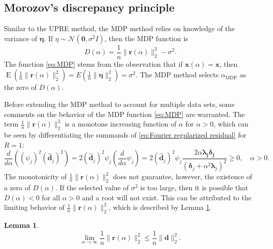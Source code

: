 \documentclass[12pt]{article}
\newcommand{\dVec}{\mathbf{d}}	%
\newcommand{\rVec}{\mathbf{r}}	%
\newcommand{\xVec}{\mathbf{x}}	%
\newcommand{\dft}[1]{\widehat{#1}}	%
\newcommand{\regparam}{\alpha}  %
\newcommand{\xReg}{\xVec(\regparam)}	%
\newcommand{\mfilt}{\psi}
\newcommand{\noise}{\eta}	%
\newcommand{\noiseSD}{\sigma}	%
\newcommand{\noiseVec}{\bm{\noise}}	%
\DeclareMathOperator{\E}{E}	%
\newcommand{\D}{D}	%
\newcommand{\MDP}{\text{MDP}}	%
\newtheorem{lemma}{Lemma}[section]
\begin{document}
\subsection{Morozov's discrepancy principle} \label{sec:MDP}
Similar to the UPRE method, the MDP method relies on knowledge of the variance of $\noiseVec$. If $\noise \sim \mathcal{N}(\bm{0},\noiseSD^2I)$, then the MDP function is 
\begin{equation}
\label{eq:MDP}
\D(\regparam) = \frac{1}{n}\|\rVec(\regparam)\|_2^2 - \noiseSD^2.
\end{equation}
The function \eqref{eq:MDP} stems from the observation that if $\xReg = \xVec$, then $\E(\frac{1}{n}\|\rVec(\regparam)\|_2^2) = E(\frac{1}{n}\|\noiseVec\|_2^2) = \noiseSD^2$. The MDP method selects $\regparam_{\MDP}$ as the zero of $\D(\regparam)$.  \par 
Before extending the MDP method to account for multiple data sets, some comments on the behavior of the MDP function \eqref{eq:MDP} are warranted. The term $\frac{1}{n}\|\rVec(\regparam)\|_2^2$ is a monotone increasing function of $\regparam$ for $\regparam > 0$, which can be seen by differentiating the summands of \eqref{eq:Fourier regularized residual} for $R = 1$:
\[\frac{d}{d\regparam}\left(\left(\mfilt_j\right)^2\left(\dft{\dVec}_j\right)^2\right) = 2 \left(\dft{\dVec}_j\right)^2 \mfilt_j\left(\frac{d}{d\regparam}\mfilt_j\right) = 2 \left(\dft{\dVec}_j\right)^2 \mfilt_j \frac{2\regparam\bm{\lambda_j}\bm{\delta_j}}{\left(\bm{\delta}_j + \regparam^2 \bm{\lambda}_j\right)^2} \geq 0, \quad \regparam > 0.\]
The monotonicity of $\frac{1}{n}\|\rVec(\regparam)\|_2^2$ does not guarantee, however, the existence of a zero of $\D(\regparam)$. If the selected value of $\noiseSD^2$ is too large, then it is possible that $\D(\regparam) < 0$ for all $\regparam > 0$ and a root will not exist. This can be attributed to the limiting behavior of $\frac{1}{n}\|\rVec(\regparam)\|_2^2$, which is described by Lemma \ref{lem:Residual limit}.
\begin{lemma}
\label{lem:Residual limit}
\[\lim_{\regparam\rightarrow\infty} \frac{1}{n}\|\rVec(\regparam)\|_2^2 \leq \frac{1}{n}\|\dVec\|_2^2.\]
\end{lemma}
\end{document}

